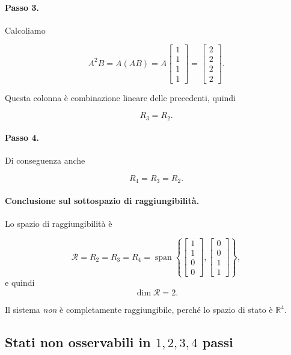 \paragraph{Passo 3.}
Calcoliamo

\[
A^2B=
A(AB)=
A
\begin{bmatrix}
1\\1\\1\\1
\end{bmatrix}
=
\begin{bmatrix}
2\\2\\2\\2
\end{bmatrix}.
\]

Questa colonna è combinazione lineare delle precedenti, quindi

\[
R_3 = R_2.
\]

\paragraph{Passo 4.}
Di conseguenza anche

\[
R_4 = R_3 = R_2.
\]

\paragraph{Conclusione sul sottospazio di raggiungibilità.}
Lo spazio di raggiungibilità è

\[
\mathcal R = R_2 = R_3 = R_4
=
\operatorname{span}\left\{
\begin{bmatrix}
1\\1\\0\\0
\end{bmatrix},
\begin{bmatrix}
0\\0\\1\\1
\end{bmatrix}
\right\},
\]
e quindi
\[
\dim \mathcal R = 2.
\]

Il sistema \emph{non} è completamente raggiungibile, perché lo spazio di stato è \(\mathbb R^4\).

\bigskip

\subsection{Stati non osservabili in \(1,2,3,4\) passi}


